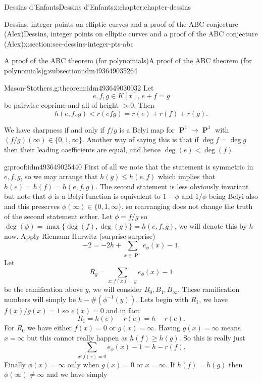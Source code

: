 \documentclass[oneside,10pt,]{book}
\numberwithin{equation}{section}
\newcommand{\inv}{^{-1}}
\DeclareMathOperator{\PP}{\mathbf{P}}
\newcommand{\lt}{<}
\newcommand{\gt}{>}
\begin{document}
\begin{chapterptx}{Dessins d'Enfants}{}{Dessins d'Enfants}{}{}{x:chapter:chapter-dessins}
\begin{sectionptx}{Dessins, integer points on elliptic curves and a proof of the ABC conjecture (Alex)}{}{Dessins, integer points on elliptic curves and a proof of the ABC conjecture (Alex)}{}{}{x:section:sec-dessins-integer-pts-abc}
\begin{subsectionptx}{A proof of the ABC theorem (for polynomials)}{}{A proof of the ABC theorem (for polynomials)}{}{}{g:subsection:idm493649035264}
\begin{theorem}{Mason-Stothers.}{}{g:theorem:idm493649030032}
Let%
\begin{equation*}
e,f,g\in K[x],\,e + f = g
\end{equation*}
be pairwise coprime and all of height \(\gt 0\). Then%
\begin{equation*}
h(e,f,g) \lt r(efg) = r(e) + r(f)  + r(g)\text{.}
\end{equation*}
%
\par
We have sharpness if and only if \(f/g\) is a Belyi map for \(\PP^1 \to \PP^1\) with \((f/g)(\infty) \in \{0,1,\infty\}\). Another way of saying this is that if \(\deg f = \deg g\) then their leading coefficients are equal, and hence \(\deg (e) \lt \deg (f)\).%
\end{theorem}
\begin{proofptx}{}{g:proof:idm493649025440}
First of all we note that the statement is symmetric in \(e,f,g\), so we may arrange that \(h(g) \le h(e,f)\) which implies that \(h(e) = h(f) = h(e,f,g)\). The second statement is less obviously invariant but note that \(\phi\) is  a Belyi function is equivalent to \(1-\phi\) and \(1/\phi\) being Belyi also and this preserves \(\phi(\infty) \in \{0,1,\infty\}\), so rearranging does not change the truth of the second statement either. Let \(\phi = f/g\) so \(\deg(\phi) = \max\{\deg (f), \deg(g)\} = h(e,f,g)\), we will denote this by \(h\) now. Apply Riemann-Hurwitz (surprise-surprise)%
\begin{equation*}
-2 = -2h + \sum_{x\in \PP^1} e_\phi(x) - 1\text{.}
\end{equation*}
Let%
\begin{equation*}
R_y = \sum_{x : f(x) = y} e_\phi(x) - 1
\end{equation*}
be the ramification above \(y\), we will consider \(B_0, B_1, B_\infty\). These ramification numbers will simply be \(h - \#(\phi\inv(y))\). Lets begin with \(R_1\), we have \(f(x)/g(x) = 1\) so \(e(x) = 0\) and in fact%
\begin{equation*}
R_1 = h(e) - r(e) = h - r(e)\text{.}
\end{equation*}
For \(R_0\) we have either \(f(x) = 0\) or \(g(x) = \infty\). Having \(g(x) = \infty\) means \(x = \infty\) but this cannot really happen as \(h(f) \ge h(g)\). So this is really just%
\begin{equation*}
\sum_{x : f(x) = 0} e_\phi(x) - 1 = h  - r(f)\text{.}
\end{equation*}
Finally \(\phi(x) = \infty\) only when \(g(x) = 0\) or \(x = \infty\). If \(h(f) = h(g)\) then \(\phi(\infty) \ne \infty\) and we have simply%
\begin{equation*}

\end{equation*}
\end{proofptx}
\end{subsectionptx}
\end{sectionptx}
\end{chapterptx}
\end{document}
